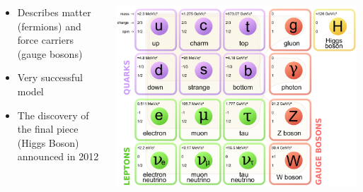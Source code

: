 \documentclass{beamer}
\newcommand*{\header}[1]{\fontsize{16}{8}\selectfont \textbf{{\color{MyPurple}{#1}}}}
\begin{document}
\begin{frame}
\begin{center}
\header{The Standard Model}
\end{center}
\begin{columns}
\begin{column}{0.5\textwidth}
\begin{itemize}
\item Describes matter (fermions) and force carriers (gauge bosons)
\item Very successful model
\item The discovery of the final piece (Higgs Boson) announced in 2012
\end{itemize}
\end{column}
\begin{column}{0.5\textwidth}
\includegraphics[width=1\textwidth]{figures/Standard_Model_of_Elementary_Particles}
\end{column}
\end{columns}
\end{frame}
\end{document}
